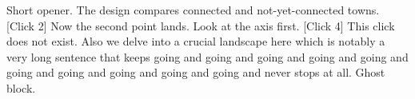 \documentclass{article}
\newcommand{\scriptframe}[3]{#3}
\begin{document}
\scriptframe{Rollout timing identifies the effect}{2 min}{%
  Short opener. The design compares connected and not-yet-connected towns. [Click 2] Now the second point lands.}
\scriptframe{Effects build over three years}{2 min}{%
  Look at the axis first. [Click 4] This click does not exist. Also we delve into a crucial landscape here which is notably a very long sentence that keeps going and going and going and going and going and going and going and going and going and going and never stops at all.}
\scriptframe{A frame that is not in the deck}{1 min}{Ghost block.}
\end{document}
